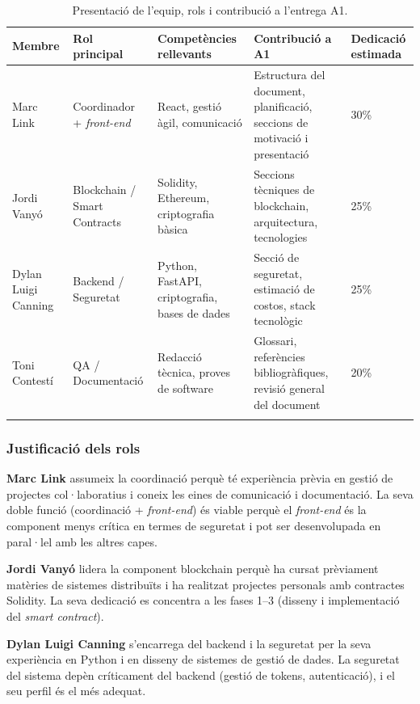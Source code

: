 \documentclass[12pt,a4paper,catalan]{article}
\begin{document}
\begin{longtable}{p{2.5cm}p{3cm}p{3cm}p{3.5cm}p{2cm}}
    \toprule
    \textbf{Membre} & \textbf{Rol principal} & \textbf{Competències rellevants} & \textbf{Contribució a A1} & \textbf{Dedicació estimada} \\
    \midrule
    Marc Link & Coordinador + \textit{front-end} & React, gestió àgil, comunicació & Estructura del document, planificació, seccions de motivació i presentació & 30\% \\
    \addlinespace
    Jordi Vanyó & Blockchain / Smart Contracts & Solidity, Ethereum, criptografia bàsica & Seccions tècniques de blockchain, arquitectura, tecnologies & 25\% \\
    \addlinespace
    Dylan Luigi Canning & Backend / Seguretat & Python, FastAPI, criptografia, bases de dades & Secció de seguretat, estimació de costos, stack tecnològic & 25\% \\
    \addlinespace
    Toni Contestí & QA / Documentació & Redacció tècnica, proves de software & Glossari, referències bibliogràfiques, revisió general del document & 20\% \\
    \bottomrule
    \caption{Presentació de l'equip, rols i contribució a l'entrega A1.}
    \label{tab:equip}
\end{longtable}

\subsubsection{Justificació dels rols}

\textbf{Marc Link} assumeix la coordinació perquè té experiència prèvia en gestió de projectes col·laboratius i coneix les eines de comunicació i documentació. La seva doble funció (coordinació + \textit{front-end}) és viable perquè el \textit{front-end} és la component menys crítica en termes de seguretat i pot ser desenvolupada en paral·lel amb les altres capes.

\textbf{Jordi Vanyó} lidera la component blockchain perquè ha cursat prèviament matèries de sistemes distribuïts i ha realitzat projectes personals amb contractes Solidity. La seva dedicació es concentra a les fases 1--3 (disseny i implementació del \textit{smart contract}).

\textbf{Dylan Luigi Canning} s'encarrega del backend i la seguretat per la seva experiència en Python i en disseny de sistemes de gestió de dades. La seguretat del sistema depèn críticament del backend (gestió de tokens, autenticació), i el seu perfil és el més adequat.
\end{document}
